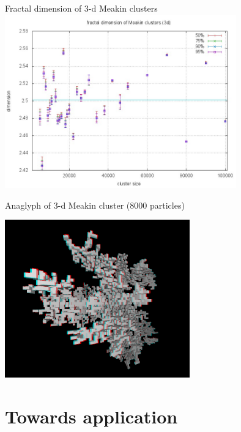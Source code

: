 \documentclass[smaller]{beamer}
\begin{document}
            \begin{frame}{Fractal dimension of 3-d Meakin clusters}
                \includegraphics[width=10cm]{img/meakin_03.jpg}
            \end{frame}

            \begin{frame}{Anaglyph of 3-d Meakin cluster (8000 particles)}
                \begin{center}
                    \includegraphics[width=8cm]{img/meakin_04.png}
                \end{center}
            \end{frame}

    \section{Towards application}
\end{document}
